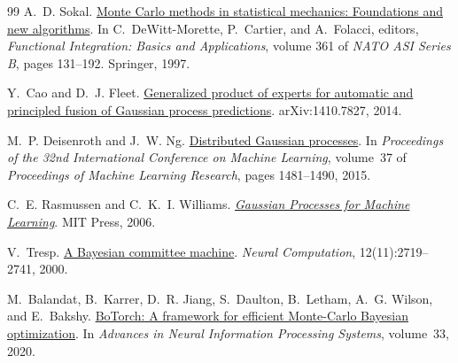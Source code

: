 \begin{thebibliography}{99}
A.~D. Sokal.
\newblock \href{https://doi.org/10.1007/978-1-4899-0319-8_6}{Monte Carlo methods in statistical
  mechanics: Foundations and new algorithms}.
\newblock In C.~DeWitt-Morette, P.~Cartier, and A.~Folacci, editors, \emph{Functional
  Integration: Basics and Applications}, volume 361 of \emph{NATO ASI Series B}, pages 131--192.
  Springer, 1997.

Y.~Cao and D.~J. Fleet.
\newblock \href{https://arxiv.org/abs/1410.7827}{Generalized product of experts for automatic and
  principled fusion of Gaussian process predictions}.
\newblock arXiv:1410.7827, 2014.

M.~P. Deisenroth and J.~W. Ng.
\newblock \href{https://proceedings.mlr.press/v37/deisenroth15.html}{Distributed Gaussian processes}.
\newblock In \emph{Proceedings of the 32nd International Conference on Machine Learning}, volume~37
  of \emph{Proceedings of Machine Learning Research}, pages 1481--1490, 2015.

C.~E. Rasmussen and C.~K.~I. Williams.
\newblock \href{https://gaussianprocess.org/gpml/}{\emph{Gaussian Processes for Machine Learning}}.
\newblock MIT Press, 2006.

V.~Tresp.
\newblock \href{https://doi.org/10.1162/089976600300014908}{A Bayesian committee machine}.
\newblock \emph{Neural Computation}, 12(11):2719--2741, 2000.

M.~Balandat, B.~Karrer, D.~R. Jiang, S.~Daulton, B.~Letham, A.~G. Wilson, and E.~Bakshy.
\newblock \href{https://arxiv.org/abs/1910.06403}{BoTorch: A framework for efficient Monte-Carlo
  Bayesian optimization}.
\newblock In \emph{Advances in Neural Information Processing Systems}, volume~33, 2020.

\end{thebibliography}
